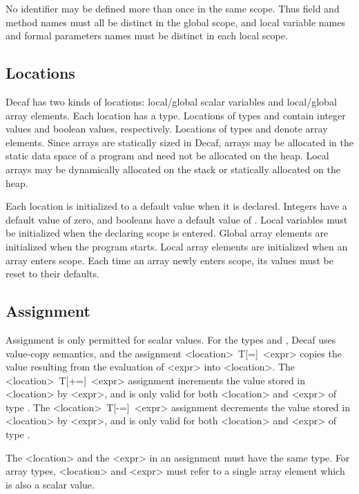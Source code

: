 No identifier may be defined more than once in the same scope.  Thus
field and method names must all be distinct in the global scope, and
local variable names and formal parameters names must be distinct in
each local scope.

\subsection*{Locations}

Decaf has two kinds of locations: local/global scalar
variables and local/global array elements.  Each location has a type.
Locations of types  and  contain integer values and
boolean values, respectively.  Locations of types 
and  denote array elements.  Since arrays are
statically sized in Decaf, arrays may be allocated in the
static data space of a program and need not be allocated on the heap. 
Local arrays may be dynamically allocated on the stack or statically 
allocated on the heap.

Each location is initialized to a default value when it is declared.
Integers have a default value of zero, and booleans have a default
value of .  Local variables must be initialized when the
declaring scope is entered.  Global array elements are initialized when the
program starts. Local array elements are initialized when an array enters scope.
Each time an array newly enters scope, its values must be reset to their defaults.

\subsection*{Assignment}

Assignment is only permitted for scalar values.  For the types
 and , Decaf uses value-copy semantics, and the
assignment {\bnf <location>~T[=]~<expr>} copies the value resulting
from the evaluation of {\bnf <expr>} into {\bnf <location>}.  The
{\bnf <location>~T[+=]~<expr>} assignment increments the value
stored in {\bnf <location>} by {\bnf <expr>}, and is only valid for
both {\bnf <location>} and {\bnf <expr>} of type . The
{\bnf <location>~T[-=]~<expr>} assignment decrements the value
stored in {\bnf <location>} by {\bnf <expr>}, and is only valid for
both {\bnf <location>} and {\bnf <expr>} of type .

The {\bnf <location>} and the {\bnf <expr>} in an assignment must
have the same type. For array types, {\bnf <location>} and {\bnf
<expr>} must refer to a single array element which is also a scalar
value.

